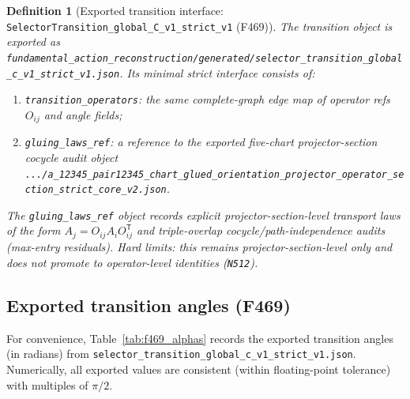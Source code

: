 \documentclass[11pt,a4paper]{article}
\newtheorem{definition}{Definition}[section]
\begin{document}
\begin{definition}[Exported transition interface: \texttt{SelectorTransition\_global\_C\_v1\_strict\_v1} (F469)]
The transition object is exported as
\verb|fundamental_action_reconstruction/generated/selector_transition_global_c_v1_strict_v1.json|.
Its minimal strict interface consists of:
\begin{enumerate}[label=\arabic*.]
  \item \texttt{transition\_operators}: the same complete-graph edge map of operator refs $O_{ij}$ and angle fields;
  \item \texttt{gluing\_laws\_ref}: a reference to the exported five-chart projector-section cocycle audit object
  \verb|.../a_12345_pair12345_chart_glued_orientation_projector_operator_section_strict_core_v2.json|.
\end{enumerate}
The \texttt{gluing\_laws\_ref} object records explicit \emph{projector-section-level} transport laws of the form
$A_j = O_{ij}A_iO_{ij}^{\mathsf T}$ and triple-overlap cocycle/path-independence audits (max-entry residuals).
\emph{Hard limits:} this remains \emph{projector-section-level} only and does not promote to operator-level identities (\texttt{N512}).
\end{definition}

\subsection{Exported transition angles (F469)}
\label{sec:f469_alphas}

For convenience, Table~\ref{tab:f469_alphas} records the exported transition angles (in radians) from
\verb|selector_transition_global_c_v1_strict_v1.json|.
Numerically, all exported values are consistent (within floating-point tolerance) with multiples of $\pi/2$.
\end{document}
